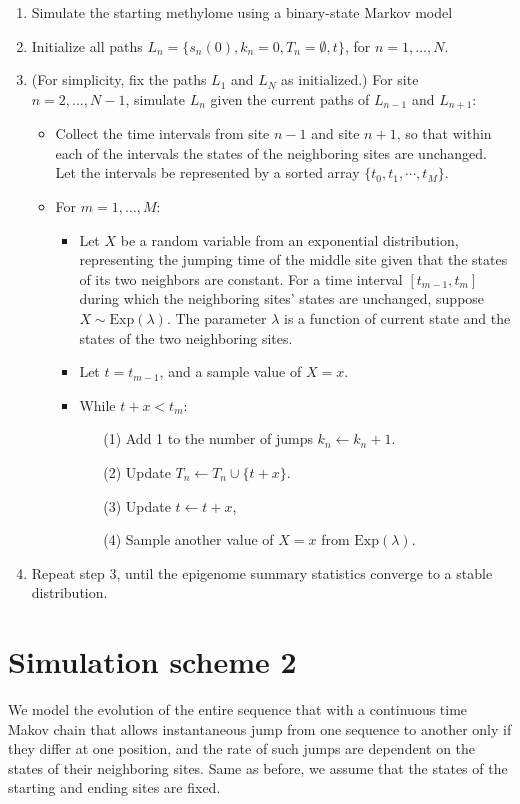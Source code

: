 \documentclass[11pt]{article}
\begin{document}
\begin{enumerate}
\item Simulate the starting methylome using a binary-state Markov model
\item Initialize all paths $L_n = \{s_n(0), k_n=0, T_n=\emptyset, t\}$, for $n=1,\ldots, N.$
\item (For simplicity, fix the paths $L_1$ and $L_N$ as initialized.) For
  site $n = 2, \ldots, N-1$, simulate $L_n$ given the current paths of
  $L_{n-1}$ and $L_{n+1}$:
  \begin{itemize}
  \item Collect the time intervals from site $n-1$ and site $n+1$, so
    that within each of the intervals the states of the neighboring
    sites are unchanged. Let the intervals be represented by a sorted
    array $\{t_0, t_1, \cdots, t_M\}$.
  \item For $m = 1, \ldots, M$:
    \begin{itemize}
      \item Let $X$ be a random variable from an exponential
        distribution, representing the jumping time of the middle site given
        that the states of its two neighbors are constant.  For a time
        interval $[t_{m-1}, t_m]$ during which the neighboring sites' states
        are unchanged, suppose $X\sim \text{Exp}(\lambda)$. The parameter
        $\lambda$ is a function of current state and the states of the two
        neighboring sites.
      \item Let $t = t_{m-1}$, and a sample value of $X=x$.
      \item While $t +x < t_m$:
        \begin{enumerate}
        \item[(1)] Add 1 to the number of jumps $k_n \leftarrow k_n +1$.
        \item[(2)] Update $T_n \leftarrow T_n\cup\{t+x\}$.
        \item[(3)] Update $t \leftarrow  t+x$,
        \item[(4)] Sample another value of $X=x$ from $\text{Exp}(\lambda)$. 
        \end{enumerate}
      \end{itemize}
  \end{itemize}
\item Repeat step 3, until the epigenome summary statistics converge to
  a stable distribution.
\end{enumerate}


\section{Simulation scheme 2}
We model the evolution of the entire sequence that with a
continuous time Makov chain that allows instantaneous jump from one
sequence to another only if they differ at one position, and the rate
of such jumps are dependent on the states of their neighboring
sites. Same as before, we assume that the states of the starting and
ending sites are fixed.
\end{document}

